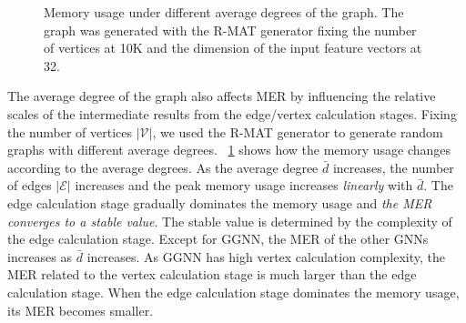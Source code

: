 \begin{figure}
    \centering
    \caption{Memory usage under different average degrees of the graph. The graph was generated with the R-MAT generator fixing the number of vertices at 10K and the dimension of the input feature vectors at 32.}
    \label{fig:exp_memory_expansion_ratio_input_graph_number_of_edges}
\end{figure}

The average degree of the graph also affects MER by influencing the relative scales of the intermediate results from the edge/vertex calculation stages.
Fixing the number of vertices $|\mathcal{V}|$, we used the R-MAT generator to generate random graphs with different average degrees.
\figurename~\ref{fig:exp_memory_expansion_ratio_input_graph_number_of_edges} shows how the memory usage changes according to the average degrees.
As the average degree $\bar{d}$ increases, the number of edges $|\mathcal{E}|$ increases and the peak memory usage increases \emph{linearly} with $\bar{d}$.
The edge calculation stage gradually dominates the memory usage and \emph{the MER converges to a stable value}.
The stable value is determined by the complexity of the edge calculation stage.
Except for GGNN, the MER of the other GNNs increases as $\bar{d}$ increases.
As GGNN has high vertex calculation complexity, the MER related to the vertex calculation stage is much larger than the edge calculation stage.
When the edge calculation stage dominates the memory usage, its MER becomes smaller.

